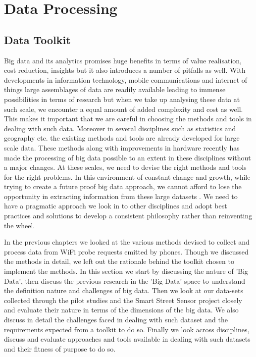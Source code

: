 \chapter{Data Processing}

\section{Data Toolkit}

Big data and its analytics promises huge benefits in terms of value realisation, cost reduction, insights but it also introduces a number of pitfalls as well.
With developments in information technology, mobile communications and internet of things large assemblages of data are readily available leading to immense possibilities in terms of research but when we take up analysing these data at such scale, we encounter a equal amount of added complexity and cost as well.
This makes it important that we are careful in choosing the methods and tools in dealing with such data.
Moreover in several disciplines such as statistics and geography etc. the existing methods and tools are already developed for large scale data.
These methods along with improvements in hardware recently has made the processing of big data possible to an extent in these disciplines without a major changes.
At these scales, we need to devise the right methods and tools for the right problems.
In this environment of constant change and growth, while trying to create a future proof big data approach, we cannot afford to lose the opportunity in extracting information from these large datasets .
We need to have a pragmatic approach we look in to other disciplines and adopt best practices and solutions to develop a consistent philosophy rather than reinventing the wheel.

In the previous chapters we looked at the various methods devised to collect and process data from WiFi probe requests emitted by phones.
Though we discussed the methods in detail, we left out the rationale behind the toolkit chosen to implement the methods.
In this section we start by discussing the nature of 'Big Data', then discuss the previous research in the 'Big Data' space to understand the definition nature and challenges of big data.
Then we look at our data-sets collected through the pilot studies and the Smart Street Sensor project closely and evaluate their nature in terms of the dimensions of the big data.
We also discuss in detail the challenges faced in dealing with such dataset and the requirements expected from a toolkit to do so.
Finally we look across disciplines, discuss and evaluate approaches and tools available in dealing with such datasets and their fitness of purpose to do so.

